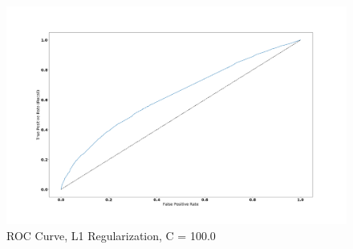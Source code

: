 \documentclass[sigconf]{acmart}
\begin{document}
\begin{figure}[!ht]
  \centering\includegraphics[width=\columnwidth]{images/roc_curve_100.png}
  \caption{ROC Curve, L1 Regularization, C = 100.0}\label{f:roc_curve_100}
\end{figure}

\appendix
\end{document}
